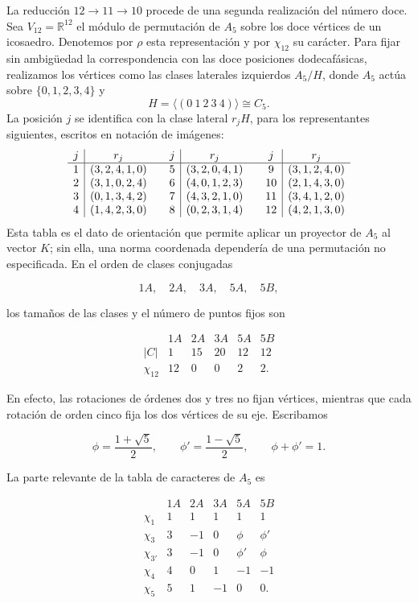 La reducción \(12\to11\to10\) procede de una segunda realización del número
doce. Sea \(V_{12}=\mathbb R^{12}\) el módulo de permutación de \(A_5\) sobre
los doce vértices de un icosaedro. Denotemos por \(\rho\) esta representación
y por \(\chi_{12}\) su carácter. Para fijar sin ambigüedad la correspondencia
con las doce posiciones dodecafásicas, realizamos los vértices como las clases laterales
izquierdos \(A_5/H\), donde \(A_5\) actúa sobre \(\{0,1,2,3,4\}\) y
\[
 H=\langle(0\ 1\ 2\ 3\ 4)\rangle\cong C_5.
\]
La posición \(j\) se identifica con la clase lateral \(r_jH\), para los
representantes siguientes, escritos en notación de imágenes:
\[
\begin{array}{c|c@{\qquad}c|c@{\qquad}c|c}
j&r_j&j&r_j&j&r_j\\ \hline
1&(3,2,4,1,0)&5&(3,2,0,4,1)&9&(3,1,2,4,0)\\
2&(3,1,0,2,4)&6&(4,0,1,2,3)&10&(2,1,4,3,0)\\
3&(0,1,3,4,2)&7&(4,3,2,1,0)&11&(3,4,1,2,0)\\
4&(1,4,2,3,0)&8&(0,2,3,1,4)&12&(4,2,1,3,0)
\end{array}
\]
Esta tabla es el dato de orientación que permite aplicar un proyector de
\(A_5\) al vector \(K\); sin ella, una norma coordenada dependería de una
permutación no especificada. En el orden de clases conjugadas

\[
1A,\quad2A,\quad3A,\quad5A,\quad5B,
\]

los tamaños de las clases y el número de puntos fijos son

\[
\begin{array}{c|rrrrr}
 &1A&2A&3A&5A&5B\\ \hline
|C|&1&15&20&12&12\\
\chi_{12}&12&0&0&2&2.
\end{array}
\]

En efecto, las rotaciones de órdenes dos y tres no fijan vértices, mientras
que cada rotación de orden cinco fija los dos vértices de su eje. Escribamos

\[
\phi=\frac{1+\sqrt5}{2},
\qquad
\phi'=\frac{1-\sqrt5}{2},
\qquad
\phi+\phi'=1.
\]

La parte relevante de la tabla de caracteres de \(A_5\) es

\[
\begin{array}{c|rrrrr}
 &1A&2A&3A&5A&5B\\ \hline
\chi_1&1&1&1&1&1\\
\chi_3&3&-1&0&\phi&\phi'\\
\chi_{3'}&3&-1&0&\phi'&\phi\\
\chi_4&4&0&1&-1&-1\\
\chi_5&5&1&-1&0&0.
\end{array}
\]

